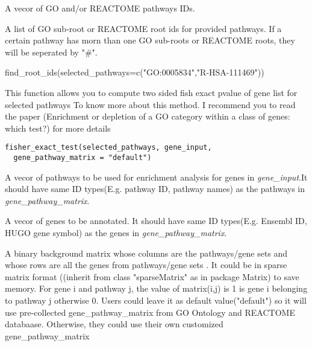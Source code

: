 \documentclass[a4paper]{book}
\begin{document}
%
\begin{Arguments}
\begin{ldescription}
\item[\code{selected\_pathways}] A vecor of GO and/or REACTOME pathways IDs.
\end{ldescription}
\end{Arguments}
%
\begin{Value}
A list of GO sub-root or REACTOME root ids for provided pathways. 
If a certain pathway has morn than one GO sub-roots or REACTOME roots, they will be seperated by "\#".
\end{Value}
%
\begin{Examples}
\begin{ExampleCode}
find_root_ids(selected_pathways=c("GO:0005834","R-HSA-111469"))
\end{ExampleCode}
\end{Examples}
%
\begin{Description}\relax
This function allows you to compute two sided fish exact pvalue of gene list for selected  pathways
To know more about this method. I recommend you to read the paper (Enrichment or depletion of a GO category within a class of genes: which test?) for more details
\end{Description}
%
\begin{Usage}
\begin{verbatim}
fisher_exact_test(selected_pathways, gene_input,
  gene_pathway_matrix = "default")
\end{verbatim}
\end{Usage}
%
\begin{Arguments}
\begin{ldescription}
\item[\code{selected\_pathways}] A vecor of pathways to be used for enrichment analysis for genes in \emph{gene\_input}.It should have same ID types(E.g. pathway ID, pathway names) as the pathways in \emph{gene\_pathway\_matrix}.

\item[\code{gene\_input}] A vecor of genes to be annotated. It should have same ID types(E.g. Ensembl ID, HUGO gene symbol) as the genes in \emph{gene\_pathway\_matrix}.

\item[\code{gene\_pathway\_matrix}] A binary background matrix whose columns are the pathways/gene sets and 
whose rows are all the genes from pathways/gene sets . It could be in sparse matrix format ((inherit from class "sparseMatrix" as in package Matrix) to save memory.
For gene i and pathway j, the value of matrix(i,j) is 1 is gene i belonging to pathway j otherwise 0.
Users could leave it as default value("default") so it will use pre-collected gene\_pathway\_matrix from GO Ontology and REACTOME databaase.
Otherwise, they could use their own customized gene\_pathway\_matrix
\end{ldescription}
\end{Arguments}
\end{document}
